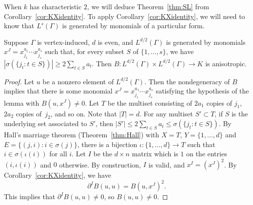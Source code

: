 When $k$ has characteristic $2$, we will deduce Theorem~\ref{thm:SL} from Corollary~\ref{cor:KXidentity}. To apply Corollary~\ref{cor:KXidentity}, we will need to know that $L^s(\Gamma)$ is generated by monomials of a particular form. 

\begin{lemm}\label{lem:generationmiddle}
Suppose  $\Gamma$ is vertex-induced, $d$ is even, and $L^{d/2}(\Gamma)$ is generated by monomials $x^J = x_{j_1}^{a_1} \dotsb x_{j_s}^{a_s}$ such that, for every subset $S$ of $\{1, \dotsc, s\}$, we have $|\sigma(\{j_t : t \in S\})| \ge 2\sum_{t \in S} a_t$. Then $B \colon L^{d/2}(\Gamma)\times L^{d/2}(\Gamma) \to K$ is anisotropic. 
\end{lemm}

\begin{proof}
Let $u$ be a nonzero element of $L^{d/2}(\Gamma)$. Then the nondegeneracy of $B$ implies that there is some monomial $x^J = x_{j_1}^{a_1} \dotsb x_{j_s}^{a_s}$ satisfying the hypothesis of the lemma with $B(u, x^J) \not=0$. Let $T$ be the multiset consisting of $2a_1$ copies of $j_1$, $2a_2$ copies of~$j_2$, and so on. Note that $|T| = d$. For any multiset $S' \subset T$, if $S$ is the underlying set associated to $S'$, then $|S'| \le 2 \sum_{t \in S} a_t \le \sigma(\{j_t : t \in S\})$. 
By Hall's marriage theorem (Theorem~\ref{thm:Hall})
with $X = T$, $Y = \{ 1,\ldots,d\}$ and $E = \{ (j,i) : i \in \sigma(j)\}$,
there is 
a bijection $\iota \colon \{1, \dotsc, d\} \to T$ such that 
$i \in \sigma(\iota(i))$ 
for all $i$.
Let $I$ be the $d \times n$ matrix which is $1$ on the entries $(i, \iota(i))$ and $0$ otherwise. By construction, $I$ is valid, and $x^I = (x^J)^2$. By Corollary~\ref{cor:KXidentity}, we have
$$\partial^I B(u, u) = B(u, x^J)^2.$$
This implies that $\partial^I B(u,u) \not=0$, so $B(u, u) \not= 0$. 
\end{proof}


